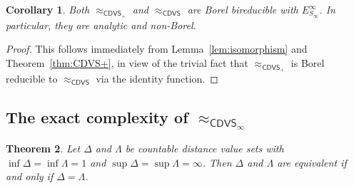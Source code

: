 \documentclass{amsart}
\newtheorem{theorem}{Theorem}[section]
\newtheorem{corollary}[theorem]{Corollary}
\theoremstyle{definition}
\theoremstyle{remark}
\begin{document}
\begin{corollary}\label{cor:main} Both $\approx_{\mathsf{CDVS}_+}$ and $\approx_{\mathsf{CDVS}}$ are Borel bireducible with $E^\infty_{S_\infty}$. In particular, they are analytic and non-Borel.
\end{corollary}

\begin{proof} This follows immediately from Lemma~\ref{lem:isomorphism} and Theorem~\ref{thm:CDVS+}, in view of the trivial fact that $\approx_{\mathsf{CDVS}_+}$ is Borel reducible to $\approx_{\mathsf{CDVS}}$ via the identity function.
\end{proof}


\subsection{The exact complexity of $\approx_{\mathsf{CDVS}_\infty}$}

\begin{theorem}\label{thm:CDVSinfty} Let $\Delta$ and $\Lambda$ be countable distance value sets with $\inf\Delta=\inf\Lambda=1$ and $\sup\Delta=\sup\Lambda=\infty$. Then $\Delta$ and $\Lambda$ are equivalent if and only if $\Delta=\Lambda$.
\end{theorem}
\end{document}

